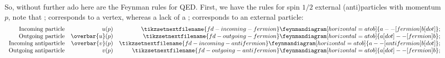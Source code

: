 \documentclass[fleqn]{NotesClass}
\newcommand{\diracadjoint}[1]{\overbar{#1}}
\begin{document}
    So, without further ado here are the Feynman rules for QED.
    First, we have the rules for spin \(1/2\) external (anti)particles with momentum \(p\), note that ; corresponds to a vertex, whereas a lack of a ; corresponds to an external particle:
    \begin{equation}
        \begin{array}{rrr}
            \text{Incoming particle} & u(p) & \tikzsetnextfilename{fd-incoming-fermion}\feynmandiagram[horizontal=a to b]{a -- [fermion] b [dot]}; \\
            \text{Outgoing particle} & \diracadjoint{u}(p) & \tikzsetnextfilename{fd-outgoing-fermion}\feynmandiagram[horizontal=a to b]{a [dot] -- [fermion] b}; \\
            \text{Incoming antiparticle} & \diracadjoint{v}(p) & \tikzsetnextfilename{fd-incoming-antifermion}\feynmandiagram[horizontal=a to b]{a -- [anti fermion] b [dot]}; \\
            \text{Outgoing antiparticle} & v(p) & \tikzsetnextfilename{fd-outgoing-antifermion}\feynmandiagram[horizontal=a to b]{a [dot] -- [fermion] b};
        \end{array}
    \end{equation}
\end{document}
